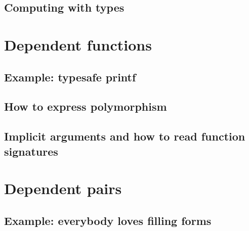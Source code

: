 \documentclass{beamer}
\begin{document}
\subsection{Computing with types}


\section{Dependent functions}


\subsection{Example: typesafe printf}

\subsection{How to express polymorphism}

\subsection{Implicit arguments and how to read function signatures}

\section{Dependent pairs}

\subsection{Example: everybody loves filling forms}
\end{document}
